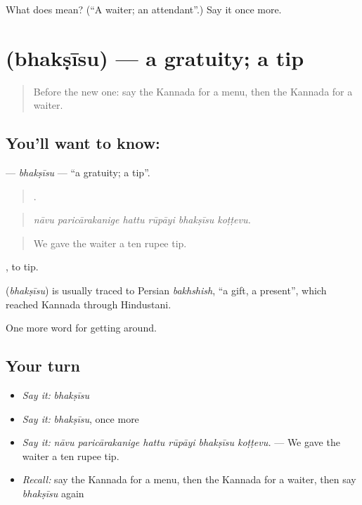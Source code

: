 \begin{tcolorbox}[breakable,colback=teal!4,colframe=teal!35!black,title={Before you move on}]
What does  mean? (\textquotedblleft{}A waiter; an attendant\textquotedblright{}.) Say it once more.
\end{tcolorbox}
\section[\texorpdfstring{\kn{ಭಕ್ಷೀಸು} (bhakṣīsu)}{ಭಕ್ಷೀಸು (bhakṣīsu)}]{ (bhakṣīsu) — a gratuity; a tip}

\label{lesson:KA-C464-bhaksisu}



\begin{quote}
Before the new one: say the Kannada for a menu, then the Kannada for a waiter.
\end{quote}

\subsection*{You'll want to know: }
\textbf{} — \emph{bhakṣīsu} — \textquotedblleft{}a gratuity; a tip\textquotedblright{}.

\begin{quote}
     .
\end{quote}

\begin{quote}
\emph{nāvu paricārakanige hattu rūpāyi bhakṣīsu koṭṭevu.}
\end{quote}

\begin{quote}
We gave the waiter a ten rupee tip.
\end{quote}

 , to tip.

\begin{cousinweb}
\textbf{} (\emph{bhakṣīsu}) is usually traced to Persian \emph{bakhshish}, \textquotedblleft{}a gift, a present\textquotedblright{}, which reached Kannada through Hindustani.
\end{cousinweb}

\begin{grammarlens}[title={What you've built}]
One more word for getting around.
\end{grammarlens}

\subsection*{Your turn}
\begin{itemize}
\raggedright
  \item \emph{Say it:} \emph{bhakṣīsu}
  \item \emph{Say it:} \emph{bhakṣīsu}, once more
  \item \emph{Say it:} \emph{nāvu paricārakanige hattu rūpāyi bhakṣīsu koṭṭevu.} — We gave the waiter a ten rupee tip.
  \item \emph{Recall:} say the Kannada for a menu, then the Kannada for a waiter, then say \emph{bhakṣīsu} again
\end{itemize}

